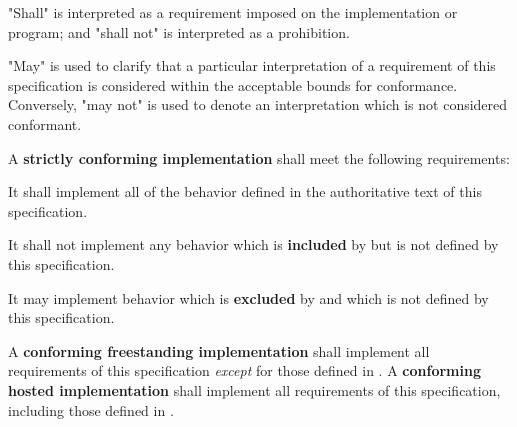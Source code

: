 
\specitem
"Shall" is interpreted as a requirement imposed on the implementation or
program; and "shall not" is interpreted as a prohibition.

\specitem
"May" is used to clarify that a particular interpretation of a requirement of
this specification is considered within the acceptable bounds for conformance.
Conversely, "may not" is used to denote an interpretation which is not
considered conformant.

\specitem
A \textbf{strictly conforming implementation} shall meet the following
requirements:

\specsubitem
It shall implement all of the behavior defined in the authoritative text of this
specification.

\specsubitem
It shall not implement any behavior which is \textbf{included} by
 but is not defined by this specification.


\specsubitem
It may implement behavior which is \textbf{excluded} by  and
which is not defined by this specification.

\specitem
A \textbf{conforming freestanding implementation} shall implement all
requirements of this specification \textit{except} for those defined in
. A \textbf{conforming hosted implementation} shall
implement all requirements of this specification, including those defined in
.

